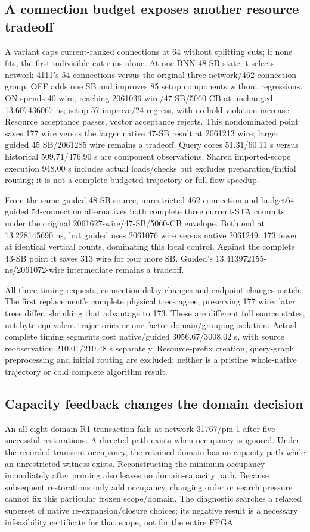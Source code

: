 \documentclass[conference,10pt]{IEEEtran}
\begin{document}
\subsection{A connection budget exposes another resource tradeoff}
A variant caps current-ranked connections at 64 without splitting cuts; if none fits, the first indivisible cut runs alone. At one BNN 48-SB state it selects network 4111's 54 connections versus the original three-network/462-connection group. OFF adds one SB and improves 85 setup components without regressions. ON spends 40 wire, reaching 2061036 wire/47 SB/5060 CB at unchanged 13.607436067 ns; setup 57 improve/24 regress, with no hold violation increase. Resource acceptance passes, vector acceptance rejects. This nondominated point saves 177 wire versus the larger native 47-SB result at 2061213 wire; larger guided 45 SB/2061285 wire remains a tradeoff. Query cores 51.31/60.11 s versus historical 509.71/476.90 s are component observations. Shared imported-scope execution 948.00 s includes actual loads/checks but excludes preparation/initial routing; it is not a complete budgeted trajectory or full-flow speedup.

From the same guided 48-SB source, unrestricted 462-connection and budget64 guided 54-connection alternatives both complete three current-STA commits under the original 2061627-wire/47-SB/5060-CB envelope. Both end at 13.228145690 ns, but guided uses 2061076 wire versus native 2061249: 173 fewer at identical vertical counts, dominating this local control. Against the complete 43-SB point it saves 313 wire for four more SB. Guided's 13.413972155-ns/2061072-wire intermediate remains a tradeoff.

All three timing requests, connection-delay changes and endpoint changes match. The first replacement's complete physical trees agree, preserving 177 wire; later trees differ, shrinking that advantage to 173. These are different full source states, not byte-equivalent trajectories or one-factor domain/grouping isolation. Actual complete timing segments cost native/guided 3056.67/3008.02 s, with source reobservation 210.01/210.48 s separately. Resource-prefix creation, query-graph preprocessing and initial routing are excluded; neither is a pristine whole-native trajectory or cold complete algorithm result.

\subsection{Capacity feedback changes the domain decision}
An all-eight-domain R1 transaction fails at network 31767/pin 1 after five successful restorations. A directed path exists when occupancy is ignored. Under the recorded transient occupancy, the retained domain has no capacity path while an unrestricted witness exists. Reconstructing the minimum occupancy immediately after pruning also leaves no domain-capacity path. Because subsequent restorations only add occupancy, changing order or search pressure cannot fix this particular frozen scope/domain. The diagnostic searches a relaxed superset of native re-expansion/closure choices; its negative result is a necessary infeasibility certificate for that scope, not for the entire FPGA.
\end{document}
